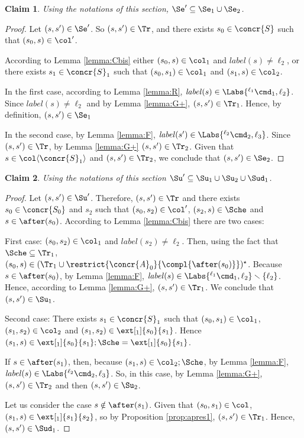 \documentclass[12pt]{article}
\let\firstunion\cup
\let\cup\firstunion
\renewcommand{\subset}{\subseteq}
\newcommand{\li}[1]{ {}^{\ell_{#1}}  }
\newcommand{\lbl}{\mathit{label}}
\newtheorem{claim}{Claim}
\begin{document}
\begin{claim}\label{lemma:seq:par}
  Using the notations of this section, \(\Se'\subset \Se_1\cup\Se_2\).
\end{claim}

\begin{proof}
 Let \((s,s')\in\Se'\). So \((s,s')\in\Tr\), and there exists \(s_0\in\concr{S}\) such that \((s_0,s)\in\col'\).

According to Lemma \ref{lemma:Cbis} either \((s_0,s)\in\col_1\) and \(\lbl(s)\neq \ell_2\), or there exists \(s_1\in\concr{S}_1\) such that \((s_0,s_1)\in\col_1\) and \((s_1,s)\in\col_2\).

In the first case, according to Lemma \ref{lemma:R}, \(\lbl(s)\in\Labs{\li1\cmd_1,\ell_2}\). 
Since \(\lbl(s)\neq \ell_2\) and by Lemma \ref{lemma:G+}, \((s,s')\in\Tr_1\).
Hence, by definition, \((s,s')\in\Se_1\)

In the second case, by Lemma \ref{lemma:F}, \(\lbl(s')\in\Labs{\li2\cmd_2,\ell_3}\).
Since \((s,s')\in\Tr\), by Lemma \ref{lemma:G+} \((s,s')\in\Tr_2\).
Given that \(s\in\col\langle\concr{S}_1\rangle\) and \((s,s')\in\Tr_2\), we conclude that \((s,s')\in\Se_2\).
\end{proof}

\begin{claim}\label{lemma:seq:par2}
 Using the notations of this section \(\Su'\subset\Su_1\cup\Su_2\cup \Sud_1 \).
\end{claim}\begin{proof}Let \((s,s')\in\Su'\).
Therefore, \((s,s')\in\Tr\) and there exists \(s_0\in\concr{S_0}\) and \(s_2\) such that \((s_0,s_2)\in\col'\), \((s_2,s)\in\Sche\) and \(s\in\after(s_0)\).
According to Lemma \ref{lemma:Cbis} there are two cases:

First case: \((s_0,s_2)\in\col_1\) and \(\lbl(s_2)\neq\ell_2\).
Then, using the fact that \(\Sche\subset\Tr_1\), \((s_0,s)\in(\Tr_1\cup\restrict{{\concr{A}_0}}{\compl{\after(s_0)}})^{\star}\).
Because \(s\in\after(s_0)\), by Lemma \ref{lemma:F}, \(\lbl(s)\in\Labs{\li1\cmd_1,\ell_2}\smallsetminus \{\ell_2\}\). 
Hence, according to Lemma \ref{lemma:G+}, \((s,s')\in\Tr_1\).
We conclude that \((s,s')\in\Su_1\).


Second case:
There exists \(s_1\in\concr{S}_1\) such that \((s_0,s_1)\in\col_1\), \((s_1,s_2)\in\col_2\) and
\((s_1,s_2)\in\ext[_1]{s_0}{s_1}\). 
Hence \((s_1,s)\in\ext[_1]{s_0}{s_1};\Sche=\ext[_1]{s_0}{s_1}\).

If \(s\in\after(s_1)\), then, because \((s_1,s)\in\col_2;\Sche\), by Lemma \ref{lemma:F}, \(\lbl(s)\in\Labs{\li2\cmd_2,\ell_3}\). So, in this case, by Lemma \ref{lemma:G+}, \((s,s')\in\Tr_2\) and then  \((s,s')\in\Su_2\).

Let us consider the case \(s\notin\after(s_1)\).
Given that \((s_0,s_1)\in\col\), \((s_1,s)\in\ext[_1]{s_1}{s_2}\), so by Proposition \ref{prop:apres1}, \((s,s')\in\Tr_1\).
Hence, \((s,s')\in\Sud_1\).
 \end{proof}
\end{document}

